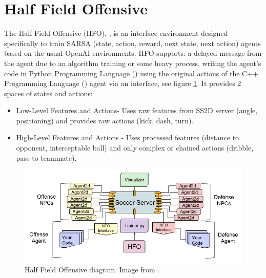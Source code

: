 \section{Half Field Offensive}\label{section:HFO}
The Half Field Offensive (HFO), \cite{hfo}, is an interface environment designed specifically to train SARSA (state, action, reward, next state, next action) agents based on the usual OpenAI environments. HFO supports: a delayed message from the agent due to an algorithm training or some heavy process, writing the agent's code in Python Programming Language (\cite{python}) using the original actions of the C++ Programming Language (\cite{cpp}) agent via an interface, see figure \ref{fig:HFO_diagram}. It provides 2 spaces of states and actions:
\begin{itemize}
    \item Low-Level Features and Actions- Uses raw features from SS2D server (angle, positioning) and provides raw actions (kick, dash, turn).
    \item High-Level Features and Actions - Uses processed features (distance to opponent, interceptable ball) and only complex or chained actions (dribble, pass to teammate).
\end{itemize}

\begin{figure}[H]
    \centering
    \includegraphics[scale=0.5]{images/HFO_diagram.png}
    \caption{Half Field Offensive diagram. Image from \cite{hfo}.}
    \label{fig:HFO_diagram}
\end{figure}